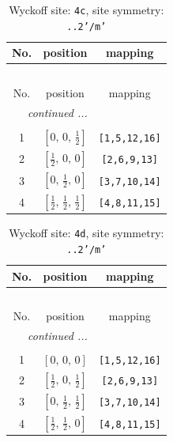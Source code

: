 \documentclass[fleqn,8pt]{jsarticle}
\begin{document}
\renewcommand{\arraystretch}{1.2}
\begin{longtable}{ccc}
\caption{Wyckoff site: {\tt 4c}, site symmetry: {\tt ..2'/m'}}
 \\
 \hline \hline
No. & position & mapping \\ \hline \endfirsthead

\multicolumn{2}{l}{\tablename\ \thetable{}} \\
 \hline \hline
No. & position & mapping \\ \hline \endhead

 \hline \hline
\multicolumn{2}{r}{\footnotesize\it continued ...} \\ \endfoot

 \hline \hline
\multicolumn{2}{r}{} \\ \endlastfoot

1 & $\left[ 0,\, 0,\, \frac{1}{2} \right]$ & {\tt [1,5,12,16]} \\ \hline
2 & $\left[ \frac{1}{2},\, 0,\, 0 \right]$ & {\tt [2,6,9,13]} \\ \hline
3 & $\left[ 0,\, \frac{1}{2},\, 0 \right]$ & {\tt [3,7,10,14]} \\ \hline
4 & $\left[ \frac{1}{2},\, \frac{1}{2},\, \frac{1}{2} \right]$ & {\tt [4,8,11,15]} \\
\end{longtable}
\renewcommand{\arraystretch}{1.2}
\begin{longtable}{ccc}
\caption{Wyckoff site: {\tt 4d}, site symmetry: {\tt ..2'/m'}}
 \\
 \hline \hline
No. & position & mapping \\ \hline \endfirsthead

\multicolumn{2}{l}{\tablename\ \thetable{}} \\
 \hline \hline
No. & position & mapping \\ \hline \endhead

 \hline \hline
\multicolumn{2}{r}{\footnotesize\it continued ...} \\ \endfoot

 \hline \hline
\multicolumn{2}{r}{} \\ \endlastfoot

1 & $\left[ 0,\, 0,\, 0 \right]$ & {\tt [1,5,12,16]} \\ \hline
2 & $\left[ \frac{1}{2},\, 0,\, \frac{1}{2} \right]$ & {\tt [2,6,9,13]} \\ \hline
3 & $\left[ 0,\, \frac{1}{2},\, \frac{1}{2} \right]$ & {\tt [3,7,10,14]} \\ \hline
4 & $\left[ \frac{1}{2},\, \frac{1}{2},\, 0 \right]$ & {\tt [4,8,11,15]} \\
\end{longtable}
\end{document}

